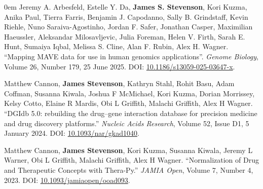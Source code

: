 \documentclass[letterpaper,11pt]{article}
\begin{document}
\begin{addmargin}[1em]{0em}
Jeremy A. Arbesfeld, Estelle Y. Da, \textbf{James S. Stevenson}, Kori Kuzma, Anika Paul, Tierra Farris, Benjamin J. Capodanno, Sally B. Grindstaff, Kevin Riehle, Nuno Saraiva-Agostinho, Jordan F. Safer, Jonathan Casper, Maximilian Haeussler, Aleksandar Milosavljevic, Julia Foreman, Helen V. Firth, Sarah E. Hunt, Sumaiya Iqbal, Melissa S. Cline, Alan F. Rubin, Alex H. Wagner.
``Mapping MAVE data for use in human genomics applications''. \emph{Genome Biology}, Volume 26, Number 179, 25 June 2025. DOI: \href{https://doi.org/10.1186/s13059-025-03647-x}{10.1186/s13059-025-03647-x}.

\vspace{8pt}\par

Matthew Cannon, \textbf{James Stevenson}, Kathryn Stahl, Rohit Basu, Adam Coffman, Susanna Kiwala, Joshua F McMichael, Kori Kuzma, Dorian Morrissey, Kelsy Cotto, Elaine R Mardis, Obi L Griffith, Malachi Griffith, Alex H Wagner.
``DGIdb 5.0: rebuilding the drug–gene interaction database for precision medicine and drug discovery platforms.'' \emph{Nucleic Acids Research}, Volume 52, Issue D1, 5 January 2024. DOI: \href{https://doi.org/10.1093/nar/gkad1040}{10.1093/nar/gkad1040}.

\vspace{8pt}\par

Matthew Cannon, \textbf{James Stevenson}, Kori Kuzma, Susanna Kiwala, Jeremy L Warner, Obi L Griffith, Malachi Griffith, Alex H Wagner.
``Normalization of Drug and Therapeutic Concepts with Thera-Py.'' \emph{JAMIA Open}, Volume 7, Number 4, 2023. DOI: \href{https://doi.org/10.1093/jamiaopen/ooad093}{10.1093/jamiaopen/ooad093}.

\end{addmargin}

\end{document}
